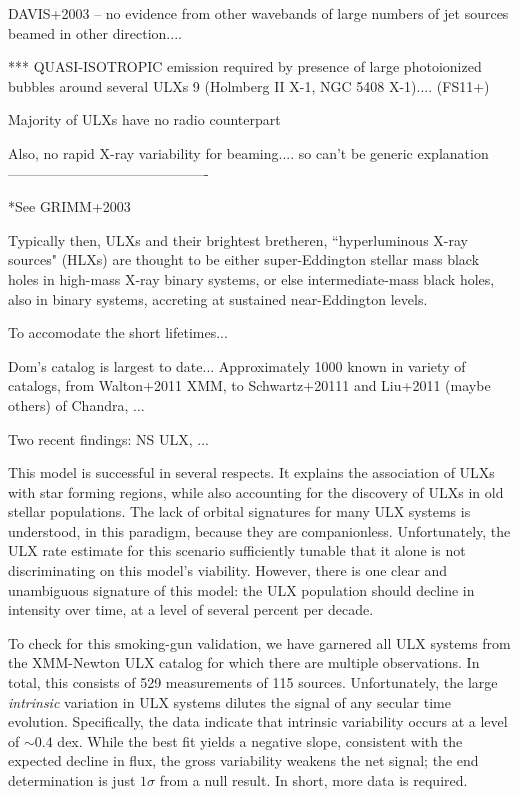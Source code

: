 DAVIS+2003 -- no evidence from other wavebands of large numbers of jet sources beamed in other direction....  

*** QUASI-ISOTROPIC emission required by presence of large photoionized bubbles around several ULXs 9 (Holmberg II X-1, NGC 5408 X-1)....  (FS11+)

Majority of ULXs have no radio counterpart   

Also, no rapid X-ray variability for beaming.... so can't be generic explanation
-------------------------------------------


*See GRIMM+2003


Typically then, ULXs and their brightest bretheren, ``hyperluminous X-ray sources" (HLXs) are thought to be either super-Eddington stellar mass black holes in high-mass X-ray binary systems, or else intermediate-mass black holes, also in binary systems, accreting at sustained near-Eddington levels.    

To accomodate the short lifetimes... 


Dom's catalog is largest to date...   Approximately 1000 known in variety of catalogs, from Walton+2011 XMM, to Schwartz+20111 and Liu+2011 (maybe others) of Chandra, ...

Two recent findings:  NS ULX, ...








This model is successful in several respects. It explains the
association of ULXs with star forming regions, while also accounting
for the discovery of ULXs in old stellar populations.  The
lack of orbital signatures for many ULX systems is understood, in this
paradigm, because they are companionless.  Unfortunately, the ULX rate
estimate for this scenario sufficiently tunable that it alone is not
discriminating on this model's viability.  However, there is one clear
and unambiguous signature of this model: the ULX population should
decline in intensity over time, at a level of several percent per
decade.

To check for this smoking-gun validation, we have garnered all ULX
systems from the \citet{Walton_2011} XMM-Newton ULX catalog for which
there are multiple observations.  In total, this consists of 529
measurements of 115 sources.  Unfortunately, the large {\em intrinsic}
variation in ULX systems dilutes the signal of any secular time
evolution.  Specifically, the data indicate that intrinsic variability
occurs at a level of $\sim0.4$ dex.  While the best fit yields a
negative slope, consistent with the expected decline in flux, the
gross variability weakens the net signal; the end determination is
just $1\sigma$ from a null result.  In short, more data is required.


